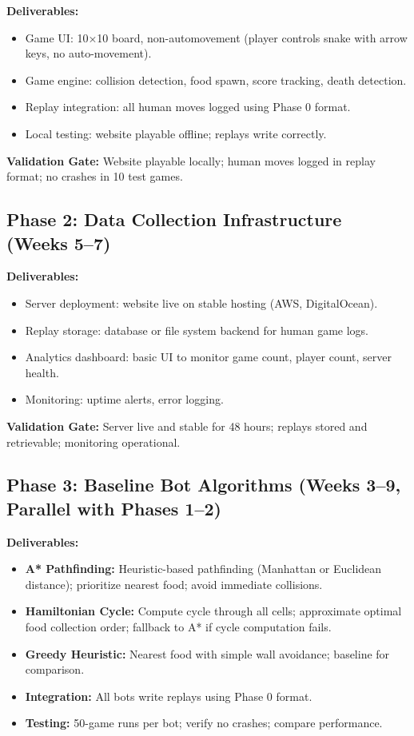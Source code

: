 \documentclass[a4paper]{article}
\begin{document}
\textbf{Deliverables:}
\begin{itemize}
\item Game UI: 10×10 board, non-automovement (player controls snake with arrow keys, no auto-movement).
\item Game engine: collision detection, food spawn, score tracking, death detection.
\item Replay integration: all human moves logged using Phase 0 format.
\item Local testing: website playable offline; replays write correctly.
\end{itemize}

\textbf{Validation Gate:} Website playable locally; human moves logged in replay format; no crashes in 10 test games.

\subsection{Phase 2: Data Collection Infrastructure (Weeks 5--7)}

\textbf{Deliverables:}
\begin{itemize}
\item Server deployment: website live on stable hosting (AWS, DigitalOcean).
\item Replay storage: database or file system backend for human game logs.
\item Analytics dashboard: basic UI to monitor game count, player count, server health.
\item Monitoring: uptime alerts, error logging.
\end{itemize}

\textbf{Validation Gate:} Server live and stable for 48 hours; replays stored and retrievable; monitoring operational.

\subsection{Phase 3: Baseline Bot Algorithms (Weeks 3--9, Parallel with Phases 1--2)}

\textbf{Deliverables:}
\begin{itemize}
\item \textbf{A* Pathfinding:} Heuristic-based pathfinding (Manhattan or Euclidean distance); prioritize nearest food; avoid immediate collisions.
\item \textbf{Hamiltonian Cycle:} Compute cycle through all cells; approximate optimal food collection order; fallback to A* if cycle computation fails.
\item \textbf{Greedy Heuristic:} Nearest food with simple wall avoidance; baseline for comparison.
\item \textbf{Integration:} All bots write replays using Phase 0 format.
\item \textbf{Testing:} 50-game runs per bot; verify no crashes; compare performance.
\end{itemize}
\end{document}
